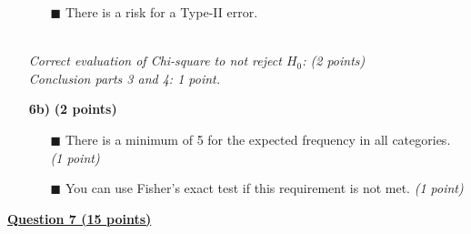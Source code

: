\begin{itemize}
\begin{itemize}
        \item[$\blacksquare$] There is a risk for a Type-II error.
    \end{itemize} \\
    \textit{Correct evaluation of Chi-square to not reject $H_0$: (2 points) \\ Conclusion parts 3 and 4: 1 point.} \\
\item[\textbf{6b)}] \textbf{(2 points)} \\
    \begin{itemize}
        \item[$\blacksquare$] There is a minimum of 5 for the expected frequency in all categories. \textit{(1 point)}
        \item[$\blacksquare$] You can use Fisher’s exact test if this requirement is not met. \textit{(1 point)}
        \end{itemize}
\end{itemize}

\underline{\textbf{Question 7 (15 points)}} \\

